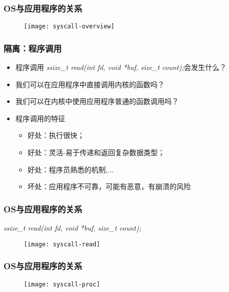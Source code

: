 \begin{frame}
    
    \frametitle{OS与应用程序的关系}
    
    \begin{figure}
        \centering
        \texttt{[image: syscall-overview]}
    \end{figure}
    
\end{frame}



\begin{frame}
	\frametitle{隔离：\small{程序调用}}
	\begin{itemize}
		\item 程序调用 \textit{ssize\_t read(int fd, void *buf, size\_t count);}会发生什么？
		\item 我们可以在应用程序中直接调用内核的函数吗？
		\item 我们可以在内核中使用应用程序普通的函数调用吗？ \pause
		\item 程序调用的特征
		\begin{itemize}
			\item 好处：执行很快；
			\item 好处：灵活-易于传递和返回复杂数据类型；
			\item 好处：程序员熟悉的机制,...
			\item 坏处：应用程序不可靠，可能有恶意，有崩溃的风险
			
		\end{itemize}
	\end{itemize}
\end{frame}


\begin{frame}
    
    \frametitle{OS与应用程序的关系}
     \small{\textit{ssize\_t read(int fd, void *buf, size\_t count);}}
    \begin{figure}
        \centering
        \texttt{[image: syscall-read]}
    \end{figure}
    
\end{frame}


\begin{frame}
    
    \frametitle{OS与应用程序的关系}
    
    \begin{figure}
        \centering
        \texttt{[image: syscall-proc]}
    \end{figure}
    
\end{frame}

